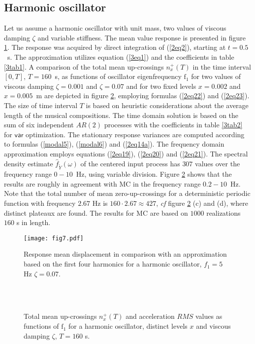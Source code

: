 \documentclass[preprint,12pt,authoryear]{elsarticle}
\begin{document}
\subsection{Harmonic oscillator}
\label{harmosc}
Let us assume a harmonic oscillator with unit mass, two values of viscous damping $\zeta$ and variable stiffness. The mean value response is presented in figure \ref{4fig2}. The response was acquired by direct integration of (\ref{2eq2}), starting at $t=0.5$~s. The approximation utilizes equation (\ref{3eq1}) and the coefficients in table \ref{3tab1}. A comparison of the total mean up-crossings $n_x^+(T)$ in the time interval $[0,T]$, $T=160$~s, as functions of oscillator eigenfrequency $\mbox{f}_1$ for two values of viscous damping $\zeta=0.001$ and $\zeta=0.07$ and for two fixed levels $x=0.002$ and $x=0.005$~m are depicted in figure \ref{4fig3}, employing formulas (\ref{2eq22}) and (\ref{2eq23}). The size of time interval $T$ is based on heuristic considerations about the average length of the musical compositions. The time domain solution is based on the sum of six independent $AR(2)$ processes with the coefficients in table \ref{3tab2} for $\mathsf{var}$ optimization. The stationary response variances are computed according to formulas (\ref{modal5}), (\ref{modal6}) and (\ref{2eq14a}). The frequency domain approximation employs equations (\ref{2eq19}), (\ref{2eq20}) and (\ref{2eq21}). The spectral density estimate $\hat{f}_{\tilde{Y}}(\omega)$ of the centered input process has $307$ values over the frequency range $0-10$~Hz, using variable division. Figure \ref{4fig3} shows that the results are roughly in agreement with MC in the frequency range $0.2-10$~Hz. Note that the total number of mean zero-up-crossings for a deterministic periodic function with frequency $2.67$ Hz is $160\cdot 2.67\approx 427$, \textit{cf} figure \ref{4fig3} (c) and (d), where distinct plateaux are found. The results for MC are based on $1000$ realizations $160$ s in length.
\begin{figure}
	\centering
	\texttt{[image: fig7.pdf]}
	\caption{Response mean displacement in comparison with an approximation based on the first four harmonics for a harmonic oscillator, $f_1=5$ Hz $\zeta=0.07$.}
	\label{4fig2}
\end{figure}
\begin{figure}
	\centering
{}
\\
\\
	\caption{Total mean up-crossings $n_x^+(T)$ and acceleration $RMS$ values as functions of $\mbox{f}_1$ for a harmonic oscillator, distinct levels $x$ and viscous damping $\zeta$, $T=160$ s.}
	\label{4fig3}
\end{figure}
\end{document}
